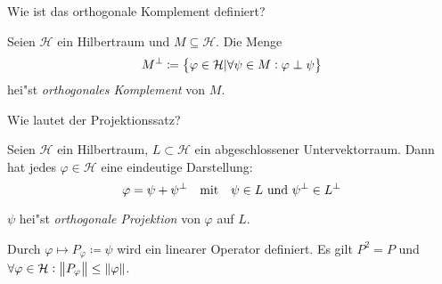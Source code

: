 \documentclass[9pt]{article}
\newcommand{\Hi}{\mathcal{H}}
\newenvironment{field}{}{\newpage}
\newif\ifnote
\newenvironment{note}{\notetrue}{\notefalse}
\newcommand{\localtag}{}
\newcommand{\globaltag}{}
\newcommand{\uuid}{}
\newcommand{\tags}[1]{
    \ifnote 
        \renewcommand{\localtag}{#1}
    \else
        \renewcommand{\globaltag}{#1}
    \fi 
    }
\newcommand{\xplain}[1]{\renewcommand{\uuid}{#1}}
\begin{document}
	\begin{note}
		\xplain{ceabc1dc-0f77-450a-8523-3235056376fc}
		\tags{definition, satz, 5.2.11, 5.2.12}
			
		\begin{field}  %
			Wie ist das orthogonale Komplement definiert?
		\end{field}
		
		\begin{field}  %
			Seien $\Hi$ ein Hilbertraum und $M \subseteq \Hi$. Die Menge 
			\begin{equation*}
				M^\perp \coloneqq \qty{\varphi \in \Hi| \forall \psi \in M: \varphi \perp \psi}
			\end{equation*} 
			hei"st \textit{orthogonales Komplement} von $M$.
		\end{field}
			
		\begin{field}  %
			Wie lautet der Projektionssatz?
		\end{field}
		
		\begin{field}  %
			Seien $\Hi$ ein Hilbertraum, $L \subset \Hi$ ein abgeschlossener Untervektorraum. Dann hat jedes $\varphi \in \Hi$ eine eindeutige Darstellung:
			\begin{equation*}
				\varphi = \psi + \psi^\perp \qq{mit} \psi \in L \text{ und } \psi^\perp \in L^\perp
			\end{equation*}
			
			$\psi$ hei"st \textit{orthogonale Projektion} von $\varphi$ auf $L$. 
			
			Durch $\varphi \mapsto P_\varphi \coloneqq \psi$ wird ein linearer Operator definiert. Es gilt $P^2=P$ und $\forall \varphi \in \Hi: \norm{P_\varphi} \leq \norm{\varphi}$.
		\end{field}
	\end{note}
\end{document}
